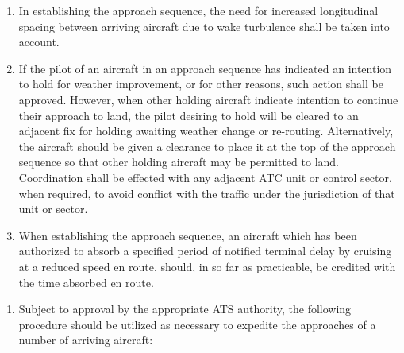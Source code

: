 \begin{enumeratesc}
\begin{enumerate}
        \item In establishing the approach sequence, the need for increased longitudinal spacing between arriving aircraft due to wake turbulence shall be taken into account.
        \item If the pilot of an aircraft in an approach sequence has indicated an intention to hold for weather improvement, or for other reasons, such action shall be approved. However, when other holding aircraft indicate intention to continue their approach to land, the pilot desiring to hold will be cleared to an adjacent fix for holding awaiting weather change or re-routing. Alternatively, the aircraft should be given a clearance to place it at the top of the approach sequence so that other holding aircraft may be permitted to land. Coordination shall be effected with any adjacent ATC unit or control sector, when required, to avoid conflict with the traffic under the jurisdiction of that unit or sector.
        \item When establishing the approach sequence, an aircraft which has been authorized to absorb a specified period of notified terminal delay by cruising at a reduced speed en route, should, in so far as practicable, be credited with the time absorbed en route.
    \end{enumerate}

    \begin{enumeratescit}
         \label{6.5.6.2.1}
        \begin{enumerate}
            \item Subject to approval by the appropriate ATS authority, the following procedure should be utilized as necessary to expedite the approaches of a number of arriving aircraft:



\end{enumerate}
\end{enumeratescit}
\end{enumeratesc}
